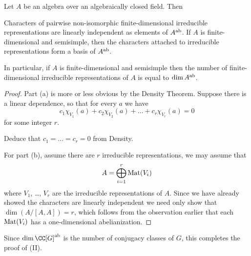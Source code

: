 \begin{theorem}
	Let $A$ be an algebra over an algebraically closed field. Then
	\begin{enumerate}[(a)]
		\ii Characters of pairwise non-isomorphic finite-dimensional
		irreducible representations are linearly independent
		as elements of $A^\text{ab}$.
		\ii If $A$ is finite-dimensional and semisimple,
		then the characters attached to irreducible representations
		form a basis of $A^\text{ab}$.
	\end{enumerate}
	In particular, if $A$ is finite-dimensional and semisimple
	then the number of finite-dimensional irreducible representations
	of $A$ is equal to $\dim A^\text{ab}$.
\end{theorem}
\begin{proof}
	Part (a) is more or less obvious by the Density Theorem.
	Suppose there is a linear dependence, so that for every $a$ we have
	\[ c_1 \chi_{V_1}(a) + c_2 \chi_{V_2}(a) + \dots + c_r \chi_{V_r} (a) = 0\]
	for some integer $r$.
	\begin{ques}
		Deduce that $c_1 = \dots = c_r = 0$ from Density.
	\end{ques}
	For part (b), assume there are $r$ irreducible representations,
	we may assume that \[ A = \bigoplus_{i=1}^r \mathrm{Mat}(V_i) \]
	where $V_1$, \dots, $V_r$ are the irreducible representations of $A$.
	Since we have already showed the characters are linearly independent
	we need only show that $\dim ( A / [A,A] ) = r$,
	which follows from the observation earlier that each $\mathrm{Mat}(V_i)$
	has a one-dimensional abelianization.
\end{proof}
Since $\dim \CC[G]\ab$ is the number of conjugacy classes of $G$,
this completes the proof of (II).

